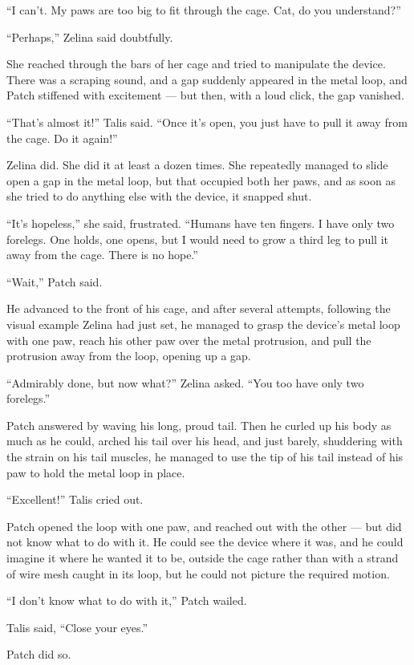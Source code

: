 \documentclass[ebook,oneside,openany,12pt]{memoir}
\begin{document}
“I can’t. My paws are too big to fit through the cage. Cat, do you
understand?”

“Perhaps,” Zelina said doubtfully.

She reached through the bars of her cage and tried to manipulate the
device. There was a scraping sound, and a gap suddenly appeared in the
metal loop, and Patch stiffened with excitement — but then, with a
loud click, the gap vanished.

“That’s almost it!” Talis said. “Once it’s open, you just have to pull
it away from the cage. Do it again!”

Zelina did. She did it at least a dozen times. She repeatedly managed
to slide open a gap in the metal loop, but that occupied both her
paws, and as soon as she tried to do anything else with the device, it
snapped shut.

“It’s hopeless,” she said, frustrated. “Humans have ten fingers. I
have only two forelegs. One holds, one opens, but I would need to grow
a third leg to pull it away from the cage. There is no hope.”

“Wait,” Patch said.

He advanced to the front of his cage, and after several attempts,
following the visual example Zelina had just set, he managed to grasp
the device’s metal loop with one paw, reach his other paw over the
metal protrusion, and pull the protrusion away from the loop, opening
up a gap.

“Admirably done, but now what?” Zelina asked. “You too have only two
forelegs.”

Patch answered by waving his long, proud tail. Then he curled up his
body as much as he could, arched his tail over his head, and just
barely, shuddering with the strain on his tail muscles, he managed to
use the tip of his tail instead of his paw to hold the metal loop in
place.

“Excellent!” Talis cried out.

Patch opened the loop with one paw, and reached out with the other —
but did not know what to do with it. He could see the device where it
was, and he could imagine it where he wanted it to be, outside the
cage rather than with a strand of wire mesh caught in its loop, but he
could not picture the required motion.

“I don’t know what to do with it,” Patch wailed.

Talis said, “Close your eyes.”

Patch did so.
\end{document}
